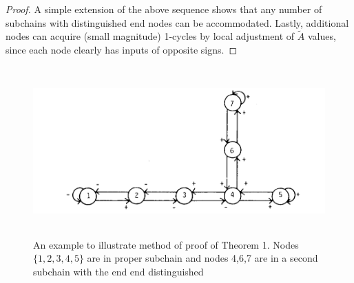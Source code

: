 \begin{proof}
	A simple extension of the above sequence shows that any number of subchains with distinguished end nodes can be accommodated. Lastly, additional nodes can acquire (small magnitude) 1-cycles by local adjustment of $\tilde{A}$ values, since each node clearly has inputs of opposite signs.
\end{proof}
	\begin{figure}[h]
		\centering
		\includegraphics[height= 6.5cm]{Figure1.png}
		\caption{An example to illustrate method of proof of Theorem 1. Nodes $\{1,2,3,4,5\}$ are in proper subchain and nodes 4,6,7 are in a second subchain with the end end distinguished}
	\end{figure}

